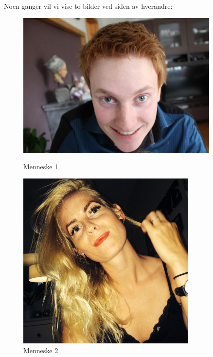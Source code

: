 \documentclass[a4paper]{report}
\begin{document}
    Noen ganger vil vi vise to bilder ved siden av hverandre:
    \begin{figure}[h!]
        \begin{minipage}{0.5\textwidth}
            \centering
            \includegraphics[width=0.9\textwidth]{figures/specimen1.jpg}
            \caption{Menneske 1} 
            \label{fig:johan}
        \end{minipage}
        \begin{minipage}{0.5\textwidth}
            \centering
            \includegraphics[width=0.8\textwidth]{figures/specimen2.jpg}
            \caption{Menneske 2} 
            \label{fig:helene}
        \end{minipage}
    \end{figure}
    
\end{document}
